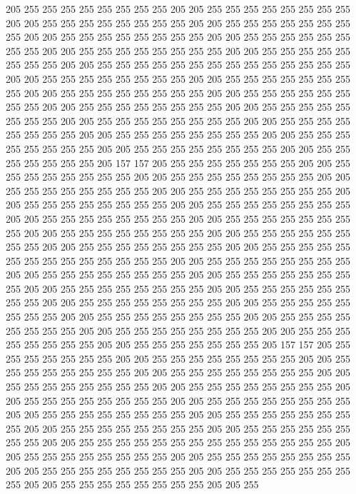 205 255 255 255 255 255 255 255 255 205 205 255 255 255 255 255 255 255 255 205
205 255 255 255 255 255 255 255 255 205 205 255 255 255 255 255 255 255 255 205
205 255 255 255 255 255 255 255 255 205 205 255 255 255 255 255 255 255 255 205
205 255 255 255 255 255 255 255 255 205 205 255 255 255 255 255 255 255 255 205
205 255 255 255 255 255 255 255 255 255 255 255 255 255 255 205 205 255 255 255
255 255 255 255 255 205 205 255 255 255 255 255 255 255 255 205 205 255 255 255
255 255 255 255 255 205 205 255 255 255 255 255 255 255 255 205 205 255 255 255
255 255 255 255 255 205 205 255 255 255 255 255 255 255 255 205 205 255 255 255
255 255 255 255 255 205 205 255 255 255 255 255 255 255 255 205 205 255 255 255
255 255 255 255 255 205 205 255 255 255 255 255 255 255 255 205 205 255 255 255
255 255 255 255 255 205 205 255 255 255 255 255 255 255 205 157 157 205 255 255
255 255 255 255 255 205 205 255 255 255 255 255 255 255 255 205 205 255 255 255
255 255 255 255 255 205 205 255 255 255 255 255 255 255 255 205 205 255 255 255
255 255 255 255 255 205 205 255 255 255 255 255 255 255 255 205 205 255 255 255
255 255 255 255 255 205 205 255 255 255 255 255 255 255 255 205 205 255 255 255
255 255 255 255 255 205 205 255 255 255 255 255 255 255 255 205 205 255 255 255
255 255 255 255 255 205 205 255 255 255 255 255 255 255 255 205 205 255 255 255
255 255 255 255 255 255 255 255 255 255 255 205 205 255 255 255 255 255 255 255
255 205 205 255 255 255 255 255 255 255 255 205 205 255 255 255 255 255 255 255
255 205 205 255 255 255 255 255 255 255 255 205 205 255 255 255 255 255 255 255
255 205 205 255 255 255 255 255 255 255 255 205 205 255 255 255 255 255 255 255
255 205 205 255 255 255 255 255 255 255 255 205 205 255 255 255 255 255 255 255
255 205 205 255 255 255 255 255 255 255 255 205 205 255 255 255 255 255 255 255
255 205 205 255 255 255 255 255 255 255 205 157 157 205 255 255 255 255 255 255
255 205 205 255 255 255 255 255 255 255 255 205 205 255 255 255 255 255 255 255
255 205 205 255 255 255 255 255 255 255 255 205 205 255 255 255 255 255 255 255
255 205 205 255 255 255 255 255 255 255 255 205 205 255 255 255 255 255 255 255
255 205 205 255 255 255 255 255 255 255 255 205 205 255 255 255 255 255 255 255
255 205 205 255 255 255 255 255 255 255 255 205 205 255 255 255 255 255 255 255
255 205 205 255 255 255 255 255 255 255 255 205 205 255 255 255 255 255 255 255
255 255 255 255 255 255 255 205 205 255 255 255 255 255 255 255 255 205 205 255
255 255 255 255 255 255 255 205 205 255 255 255 255 255 255 255 255 205 205 255
255 255 255 255 255 255 255 205 205 255 255 255 255 255 255 255 255 205 205 255
